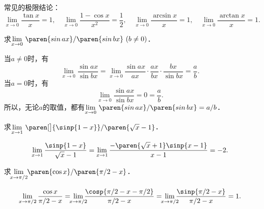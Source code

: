 \begin{example*}
  常见的极限结论：
  \begin{equation*}
    \lim_{x\to0} \frac{\tan x}{x} = 1,
    \quad
    \lim_{x\to0} \frac{1 - \cos x}{x^2} = \frac12,
    \quad
    \lim_{x\to0} \frac{\arcsin x}{x} = 1,
    \quad
    \lim_{x\to0} \frac{\arctan x}{x} = 1.
  \end{equation*}
\end{example*}

\begin{example*}
  求\(\lim\limits_{x\to0} \,\paren{\sin ax}/\paren{\sin bx}\ (b \ne 0)\)．

  \begin{remark}
    当\(a \ne 0\)时，有
    \begin{equation*}
      \lim_{x\to0} \frac{\sin ax}{\sin bx}
      = \lim_{x\to0} \frac{\sin ax}{ax} \cdot \frac{ax}{bx} \cdot \frac{bx}{\sin bx}
      = \frac ab.
    \end{equation*}
    当\(a = 0\)时，有
    \begin{equation*}
      \lim\limits_{x\to0} \frac{\sin ax}{\sin bx} = 0 = \frac ab.
    \end{equation*}
    所以，无论\(a\)的取值，都有\(\lim\limits_{x\to0} \,\paren{\sin ax}/\paren{\sin bx} = a/b\)．
  \end{remark}
\end{example*}

\begin{example*}
  求\(\lim\limits_{x\to1} \,\paren[\big]{\sinp{1-x}}/\paren{\sqrt x - 1}\)． %

  \begin{equation*}
    \lim_{x\to1} \frac{\sinp{1-x}}{\sqrt x - 1}
    = \lim_{x\to1} \frac{-\paren{\sqrt x + 1} \sinp{x-1}}{x - 1}
    = -2.
  \end{equation*}
\end{example*}

\begin{example*}
  求\(\ \lim\limits_{\mathclap{x\to\pi/2}} \ \paren{\cos x}/\paren{\pi/2 - x}\)． %

  \begin{equation*}
    \lim_{x\to\pi/2} \frac{\cos x}{\pi/2 - x}
    = \,\smashoperator{\lim_{x\to\pi/2}} \frac{\cosp{\pi/2 - x - \pi/2}}{\pi/2 - x}
    = \,\smashoperator{\lim_{x\to\pi/2}} \frac{\sinp{\pi/2 - x}}{\pi/2 - x}
    = 1.
  \end{equation*}
\end{example*}

